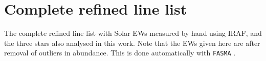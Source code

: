 \documentclass[a4paper,fleqn,usenatbib]{mnras}
\begin{document}


\appendix

% 


\section{Complete refined line list}
\label{app:linelist}

The complete refined line list with Solar EWs measured by hand using IRAF,
and the three stars also analysed in this work. Note that the EWs given here are
after removal of outliers in abundance. This is done automatically with \texttt{FASMA}
\citep{Andreasen2017a}.
\end{document}
